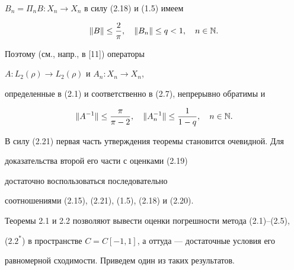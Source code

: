 $B_n=\Pi_n B:X_n\to X_n$ в силу (2.18) и (1.5) имеем


\begin{equation}


\|B\|\le \frac{2}{\pi}, \quad \|B_n\|\le q<1,\quad n\in\Bbb N.


\end{equation}


Поэтому (см., напр., в [11]) операторы


$A:L_2(\rho)\to L_2(\rho)$ и $A_n:X_n\to X_n$,


определенные в (2.1) и соответственно в (2.7), непрерывно обратимы и


\begin{equation}


\|A^{-1}\|\le\frac{\pi}{\pi-2}, \quad \|A^{-1}_{n}\|\le \frac{1}{1-q},


\quad n\in\Bbb N.


\end{equation}


В силу (2.21) первая часть утверждения теоремы становится очевидной. Для


доказательства второй его части с оценками (2.19)


достаточно воспользоваться последовательно


соотношениями (2.15), (2.21), (1.5), (2.18) и (2.20).





Теоремы 2.1 и 2.2 позволяют вывести оценки погрешности метода (2.1)--(2.5),


($2.2^*$) в пространстве $C=C[-1,1]$, а оттуда --- достаточные условия его


равномерной сходимости. Приведем один из таких результатов.





